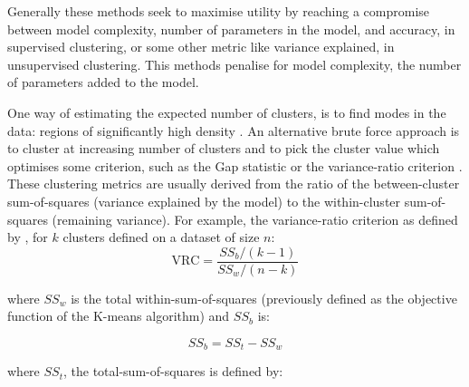 

Generally these methods seek to maximise utility by reaching a compromise between model complexity, number of parameters in the model,
and accuracy, in supervised clustering, or some other metric like variance explained, in unsupervised clustering.
This methods penalise for model complexity, the number of parameters added to the model.

One way of estimating the expected number of clusters, is to find modes in the data: regions of significantly high density \citep{Duong:2008eu,JING:2012ek}.
An alternative brute force approach is to cluster at increasing number of clusters 
and to pick the cluster value which optimises some criterion, such as the Gap statistic \citep{Tibshirani:2001fj}
or the variance-ratio criterion \citep{Calinski:1974bt}.
These clustering metrics are usually derived from the ratio of the between-cluster sum-of-squares (variance explained by the model)
to the within-cluster sum-of-squares (remaining variance).
For example, the variance-ratio criterion as defined by \citet{Calinski:1974bt}, for $k$ clusters defined on a dataset of size $n$:
\[
  \text{VRC} = \frac{SS_{b}/(k-1)}{SS_{w}/(n-k)}
\]

where $SS_{w}$ is the total within-sum-of-squares (previously defined as the objective function of the K-means algorithm) and $SS_{b}$ is:

\[
   SS_{b} = SS_{t} - SS_{w}
\]

where $SS_{t}$, the total-sum-of-squares is defined by:

